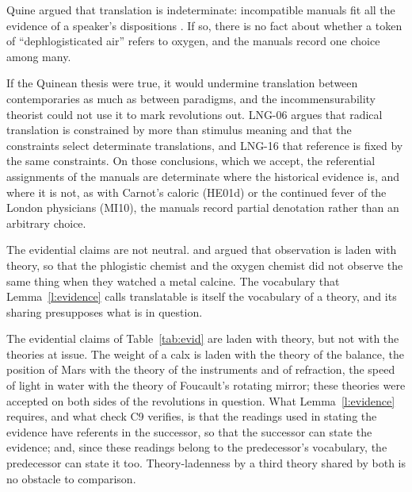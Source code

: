 \documentclass{situationist-preprint}
\begin{document}
\begin{objection}\label{o:quine}
Quine argued that translation is indeterminate: incompatible manuals fit all the evidence of a speaker's dispositions \citep{Quine1960}. If so, there is no fact about whether a token of \enquote{dephlogisticated air} refers to oxygen, and the manuals record one choice among many.
\end{objection}

\begin{reply}
If the Quinean thesis were true, it would undermine translation between contemporaries as much as between paradigms, and the incommensurability theorist could not use it to mark revolutions out. LNG-06 argues that radical translation is constrained by more than stimulus meaning and that the constraints select determinate translations, and LNG-16 that reference is fixed by the same constraints. On those conclusions, which we accept, the referential assignments of the manuals are determinate where the historical evidence is, and where it is not, as with Carnot's caloric (HE01d) or the continued fever of the London physicians (MI10), the manuals record partial denotation rather than an arbitrary choice.
\end{reply}

\begin{objection}
The evidential claims are not neutral. \citet{Hanson1958} and \citet{Kuhn1962} argued that observation is laden with theory, so that the phlogistic chemist and the oxygen chemist did not observe the same thing when they watched a metal calcine. The vocabulary that Lemma~\ref{l:evidence} calls translatable is itself the vocabulary of a theory, and its sharing presupposes what is in question.
\end{objection}

\begin{reply}
The evidential claims of Table~\ref{tab:evid} are laden with theory, but not with the theories at issue. The weight of a calx is laden with the theory of the balance, the position of Mars with the theory of the instruments and of refraction, the speed of light in water with the theory of Foucault's rotating mirror; these theories were accepted on both sides of the revolutions in question. What Lemma~\ref{l:evidence} requires, and what check C9 verifies, is that the readings used in stating the evidence have referents in the successor, so that the successor can state the evidence; and, since these readings belong to the predecessor's vocabulary, the predecessor can state it too. Theory-ladenness by a third theory shared by both is no obstacle to comparison.
\end{reply}
\end{document}
